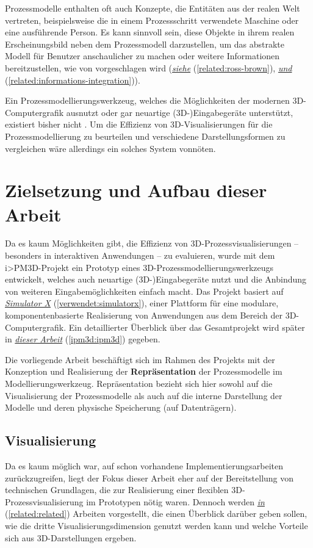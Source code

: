 \documentclass[a4paper,10pt]{sphinxmanual}
\begin{document}
Prozessmodelle enthalten oft auch Konzepte, die Entitäten aus der realen Welt vertreten, beispielsweise die in einem Prozessschritt verwendete Maschine oder eine ausführende Person.
Es kann sinnvoll sein, diese Objekte in ihrem realen Erscheinungsbild neben dem Prozessmodell darzustellen, um das abstrakte Modell für Benutzer anschaulicher zu machen oder weitere Informationen bereitzustellen, wie von \cite{brown_conceptual_2010} vorgeschlagen wird ({\hyperref[related:ross-brown]{\emph{siehe}}} (\autoref*{related:ross-brown}), {\hyperref[related:informations-integration]{\emph{und}}} (\autoref*{related:informations-integration})).

Ein Prozessmodellierungswerkzeug, welches die Möglichkeiten der modernen 3D-Computergrafik ausnutzt oder gar neuartige (3D-)Eingabegeräte unterstützt, existiert bisher nicht \cite{brown_conceptual_2010}.
Um die Effizienz von 3D-Visualisierungen für die Prozessmodellierung zu beurteilen und verschiedene Darstellungsformen zu vergleichen wäre allerdings ein solches System vonnöten.


\section{Zielsetzung und Aufbau dieser Arbeit}
\label{einleitung:zielsetzung-und-aufbau-dieser-arbeit}
Da es kaum Möglichkeiten gibt, die Effizienz von 3D-Prozessvisualisierungen – besonders in interaktiven Anwendungen – zu evaluieren, wurde mit dem i\textgreater{}PM3D-Projekt ein Prototyp eines 3D-Prozessmodellierungswerkzeugs entwickelt, welches auch neuartige (3D-)Eingabegeräte nutzt und die Anbindung von weiteren Eingabemöglichkeiten einfach macht.
Das Projekt basiert auf {\hyperref[verwendet:simulatorx]{\emph{Simulator X}}} (\autoref*{verwendet:simulatorx}), einer Plattform für eine modulare, komponentenbasierte Realisierung von Anwendungen aus dem Bereich der 3D-Computergrafik.
Ein detaillierter Überblick über das Gesamtprojekt wird später in {\hyperref[ipm3d:ipm3d]{\emph{dieser Arbeit}}} (\autoref*{ipm3d:ipm3d}) gegeben.

Die vorliegende Arbeit beschäftigt sich im Rahmen des Projekts mit der Konzeption und Realisierung der \textbf{Repräsentation} der Prozessmodelle im Modellierungswerkzeug.
Repräsentation bezieht sich hier sowohl auf die Visualisierung der Prozessmodelle als auch auf die interne Darstellung der Modelle und deren physische Speicherung (auf Datenträgern).


\subsection{Visualisierung}
\label{einleitung:visualisierung}
Da es kaum möglich war, auf schon vorhandene Implementierungsarbeiten zurückzugreifen, liegt der Fokus dieser Arbeit eher auf der Bereitstellung von technischen Grundlagen, die zur Realisierung einer flexiblen 3D-Prozessvisualisierung im Prototypen nötig waren.
Dennoch werden {\hyperref[related:related]{\emph{in}}} (\autoref*{related:related}) Arbeiten vorgestellt, die einen Überblick darüber geben sollen, wie die dritte Visualisierungsdimension genutzt werden kann und welche Vorteile sich aus 3D-Darstellungen ergeben.
\end{document}
